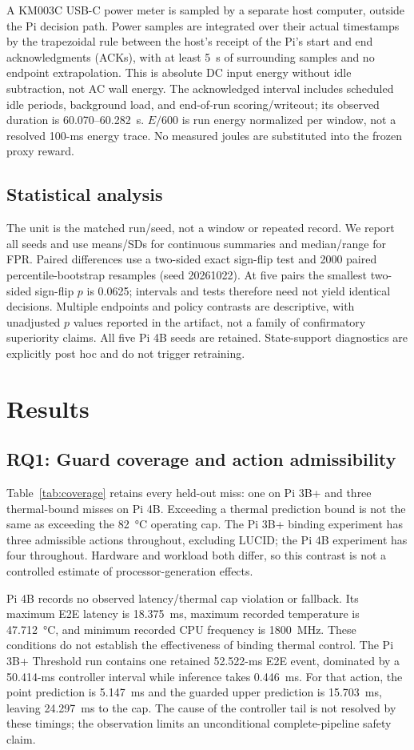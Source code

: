 \documentclass[journal]{IEEEtran}
\begin{document}
A KM003C USB-C power meter is sampled by a separate host computer, outside the Pi decision path. Power samples are integrated over their actual timestamps by the trapezoidal rule between the host's receipt of the Pi's start and end acknowledgments (ACKs), with at least 5~s of surrounding samples and no endpoint extrapolation. This is absolute DC input energy without idle subtraction, not AC wall energy. The acknowledged interval includes scheduled idle periods, background load, and end-of-run scoring/writeout; its observed duration is 60.070--60.282~s. $E/600$ is run energy normalized per window, not a resolved 100-ms energy trace. No measured joules are substituted into the frozen proxy reward.

\subsection{Statistical analysis}
The unit is the matched run/seed, not a window or repeated record. We report all seeds and use means/SDs for continuous summaries and median/range for FPR. Paired differences use a two-sided exact sign-flip test and 2000 paired percentile-bootstrap resamples (seed 20261022). At five pairs the smallest two-sided sign-flip $p$ is 0.0625; intervals and tests therefore need not yield identical decisions. Multiple endpoints and policy contrasts are descriptive, with unadjusted $p$ values reported in the artifact, not a family of confirmatory superiority claims. All five Pi 4B seeds are retained. State-support diagnostics are explicitly post hoc and do not trigger retraining.

\section{Results}
\subsection{RQ1: Guard coverage and action admissibility}
Table~\ref{tab:coverage} retains every held-out miss: one on Pi 3B+ and three thermal-bound misses on Pi 4B. Exceeding a thermal prediction bound is not the same as exceeding the \SI{82}{\celsius} operating cap. The Pi 3B+ binding experiment has three admissible actions throughout, excluding LUCID; the Pi 4B experiment has four throughout. Hardware and workload both differ, so this contrast is not a controlled estimate of processor-generation effects.

Pi 4B records no observed latency/thermal cap violation or fallback. Its maximum E2E latency is 18.375~ms, maximum recorded temperature is \SI{47.712}{\celsius}, and minimum recorded CPU frequency is 1800~MHz. These conditions do not establish the effectiveness of binding thermal control. The Pi 3B+ Threshold run contains one retained 52.522-ms E2E event, dominated by a 50.414-ms controller interval while inference takes 0.446~ms. For that action, the point prediction is 5.147~ms and the guarded upper prediction is 15.703~ms, leaving 24.297~ms to the cap. The cause of the controller tail is not resolved by these timings; the observation limits an unconditional complete-pipeline safety claim.
\end{document}
